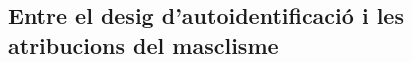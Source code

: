\begin{comment}
"Escrivia molt en aquelles planes que m'havia regalat la mestra que era amiga i que no vaig veure durant anys, hi escrivia cent vegades em vull morir, em vull morir, em vull morir... però no era cert. Sort en vaig tenir, de <textit>Mirall trencat</>, de l'<textit>Ariadna al laberint grotesc</>, de les memòries del Tísner, de Faulkner, de Goethe, de totes les lectures que passaven per les meves mans. Que el diccionari ja se m'acabava i jo havia de créixer del tot, però em resistia i pensava que tot era una fase, que aquella obsessió que tenia per mi aviat li passaria." (p.286)
--referècies a Rodoreda i altres clàssics
-- oder Kap LLengua: die Literatur (nicht nur das Wörterbuch) spielt eine wichtige Rolle in ihrem Leben


* estereotips: die Mutter kann und tut nur putzen und kochen und ihren Mann gehorchen obwohl er sich ungeheuerlich verhaelt; der Vater ist richtig ueberzogen als Arsch dargestellt, der seine Familie schlaegt, rumvoegelt und absurde Vorstellungen von Ehre, Ehe und Familie hat;
--> vlt sind die stereotypen so überzogen um den inneren (und äußeren) konflikt noch drastischer hervorzuheben?
    vlt auch um ihre Absurdität aufzuzeigen?

"Jo hi volia anar, a veure Isabel [...] i així podria saber quina cara feia una dona com aquella. Lletja, segur. Havia de ser lletja i pudent, com havia dit la mare tantes vegades que eren les dones que mengen porc." (p.185)
--estereotips (dones cristianes, dones musulmanes, gegen einander ausgespielt)

"La mare sempre deia que hauries d'estar fent això o hauries d'estar fent allò altre i jo ja havia vist que les nenes de la meva edat no sabien ni agafar bé una escombra i que no tenien cap interès a aprendre'n." (p.239)
-- entre cultures: com són les amigues

\end{comment}

\subsection{Entre el desig d'autoidentificació i les atribucions del masclisme}

\begin{comment}
  1) autoidentificació
  buscant la seva identitat
  * religió
  * literatura

  2) les atribucions
  * com han de ser les nenes/les dones?
    ** alleine fuer die ganze care arbeit zustaendig, wird als natuerliche neigung inszeniert
  * les dones i les "altres" són culpables per tot (vgl Laurie Penny)
    --> keine Solidaritaet zwischen den Frauen (zb la mare i les amants) moeglich, obwohl sie alle Opfer sind; sie werden gegen einander ausgespielt
  * frauen werden auf ihr aeusseres reduziert
  * die frauen wuerden nie genuegen;
\end{comment}

